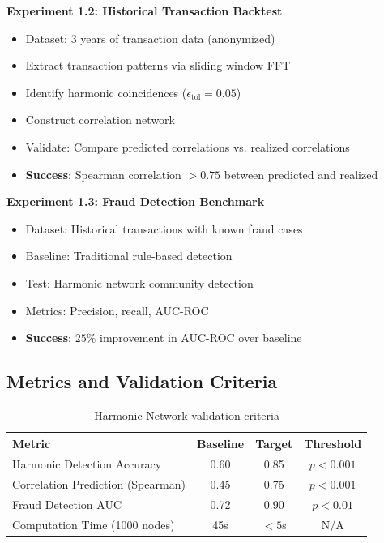 \documentclass[12pt]{article}
\begin{document}
\textbf{Experiment 1.2: Historical Transaction Backtest}
\begin{itemize}
    \item Dataset: 3 years of transaction data (anonymized)
    \item Extract transaction patterns via sliding window FFT
    \item Identify harmonic coincidences ($\epsilon_{\text{tol}} = 0.05$)
    \item Construct correlation network
    \item Validate: Compare predicted correlations vs. realized correlations
    \item \textbf{Success}: Spearman correlation $> 0.75$ between predicted and realized
\end{itemize}

\textbf{Experiment 1.3: Fraud Detection Benchmark}
\begin{itemize}
    \item Dataset: Historical transactions with known fraud cases
    \item Baseline: Traditional rule-based detection
    \item Test: Harmonic network community detection
    \item Metrics: Precision, recall, AUC-ROC
    \item \textbf{Success}: $25\%$ improvement in AUC-ROC over baseline
\end{itemize}

\subsection{Metrics and Validation Criteria}

\begin{table}[h]
\centering
\begin{tabular}{|l|c|c|c|}
\hline
Metric & Baseline & Target & Threshold \\
\hline
Harmonic Detection Accuracy & 0.60 & 0.85 & $p < 0.001$ \\
Correlation Prediction (Spearman) & 0.45 & 0.75 & $p < 0.001$ \\
Fraud Detection AUC & 0.72 & 0.90 & $p < 0.01$ \\
Computation Time (1000 nodes) & 45s & $< 5$s & N/A \\
\hline
\end{tabular}
\caption{Harmonic Network validation criteria}
\end{table}
\end{document}

